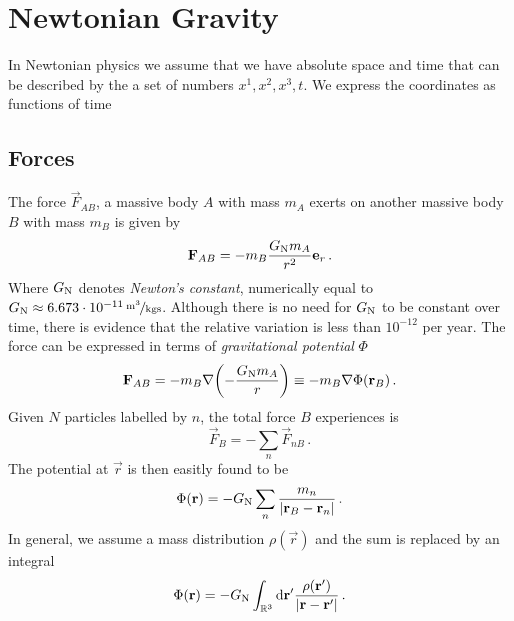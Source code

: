 \chapter{Newtonian Gravity}
In Newtonian physics we assume that we have absolute space and time that can be described by the a set of numbers $x^1,x^2,x^3,t$. We express the coordinates as functions of time
\section{Forces}
The force $\vec{F}_{AB}$, a massive body $A$ with mass $m_A$ exerts on another massive body $B$ with mass $m_B$ is given by
\begin{equation}
    \vec{F}_{AB}=-m_B\frac{G\textsubscript{N}m_A}{r^2}\vec{e}_r\, .
\end{equation}
Where $G\textsubscript{N}$ denotes \emph{Newton's constant}, numerically equal
to $G\textsubscript{N}\approx \unitfrac[6.673\cdot 10^{-11}]{m^3}{kgs}$. 
Although there is no need for $G\textsubscript{N}$ to be constant over time, 
there is evidence that the relative variation is less than $10^{-12}$ per year. 
The force can be expressed in terms of \emph{gravitational potential} $\Phi$
\begin{equation}
    \vec{F}_{AB}=-m_B\nabla\left(-\frac{G\textsubscript{N}m_A}{r}\right)\equiv
    -m_B\nabla\Phi(\vec{r}_B)\, .
\end{equation}
Given $N$ particles labelled by $n$, the total force $B$ experiences is
\begin{equation}
    \vec{F}_{B}=-\sum_n \vec{F}_{nB}\, .
\end{equation}
The potential at $\vec{r}$ is then easitly found to be
\begin{equation}
    \Phi(\vec{r})=-G\textsubscript{N}\sum_n\frac{m_n}{|\vec{r}_B-\vec{r}_n|}\, .
\end{equation}
In general, we assume a mass distribution $\rho(\vec{r})$ and the sum is
replaced by an integral
\begin{equation}
    \Phi(\vec{r})=-G\textsubscript{N}\int_{\Reals^3}\dif{\vec{r}^{\prime}}\frac{\rho(\vec{r}^{\prime})}{|\vec{r}-\vec{r}^{\prime}|}\,
    .\end{equation}
